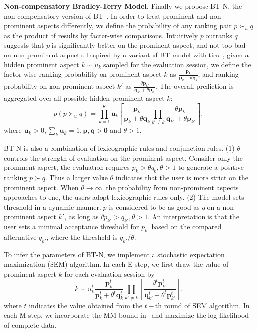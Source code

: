 \documentclass[letterpaper]{article} %
\begin{document}
\textbf{Non-compensatory Bradley-Terry Model.} Finally we propose BT-N, the non-compensatory version of BT~\cite{Hu2016Improved}. In order to treat prominent and non-prominent aspects differently, we define the probability of any ranking pair $p\succ_u q$ as the product of results by factor-wise comparisons. Intuitively $p$ outranks $q$ suggests that $p$ is significantly better on the prominent aspect, and not too bad on non-prominent aspects. Inspired by a variant of BT model with ties~\cite{Hunter2004MM}, given a hidden prominent aspect $k\sim u_k$ sampled for the evaluation session, we define the factor-wise ranking probability on prominent aspect $k$ as ${\frac{\mathbf{p}_k}{\mathbf{p}_k+\theta \mathbf{q}_k}}$, and ranking probability on non-prominent aspect $k'$ as $ \frac{\theta \mathbf{p}_{k'}}{\mathbf{q}_{k'}+\theta \mathbf{p}_{k'}}$. The overall prediction is aggregated over all possible hidden prominent aspect $k$:
\begin{equation}\label{equ:BT-N}
p(p\succ_u q)  =  \prod_{k=1}^{K} \mathbf{u}_k [ {\frac{\mathbf{p}_k}{\mathbf{p}_k+\theta \mathbf{q}_k}}\prod_{k'\neq k}{ \frac{\theta \mathbf{p}_{k'}}{\mathbf{q}_{k'}+\theta \mathbf{p}_{k'}}}],
\end{equation}
where $\mathbf{u}_k >0, \sum_k \mathbf{u}_k=1,\mathbf{p,q}>\mathbf{0}$ and $\theta>1$.  

BT-N is also a combination of lexicographic rules and conjunction rules. (1) $\theta$ controls the strength of evaluation on the prominent aspect. Consider only the prominent aspect, the evaluation requires $p_{k} > \theta q_{k}, \theta>1$ to generate a positive ranking $p\succ q$. Thus a larger value $\theta$ indicates that the user is more strict on the prominent aspect. When $\theta \rightarrow \infty$, the probability from non-prominent aspects  approaches to one, the users adopt lexicographic rules only. (2) The model sets threshold in a dynamic manner. $p$ is considered to be as good as $q$ on a non-prominent aspect $k'$, as long as $\theta p_{k'} >  q_{k'},\theta>1$.  An interpretation is that the user sets a minimal acceptance threshold for $p_{k'}$ based on the compared alternative $q_{k'}$, where the threshold is $q_{k'}/\theta$.  

To infer the parameters of BT-N, we implement a stochastic expectation maximization (SEM) algorithm. In each E-step, we first draw the value of prominent aspect $k$ for each evaluation session by
 \begin{equation}
 k \sim u_k^{t} \frac{\mathbf{p}_{k}^t} {\mathbf{p}_{k}^t+\theta^t \mathbf{q}_{k}^t} \prod_{k'\neq k}  [\frac{\theta^t \mathbf{p}_{k'}^t} {\mathbf{q}_{k'}^t + \theta^t \mathbf{p}_{k'}^t}].
 \end{equation}
 where $t$ indicates the value obtained from the $t-$th round of SEM algorithm.
 In each M-step, we incorporate the MM bound in~\cite{Hunter2004MM} and maximize the log-likelihood of complete data. 
\end{document}
